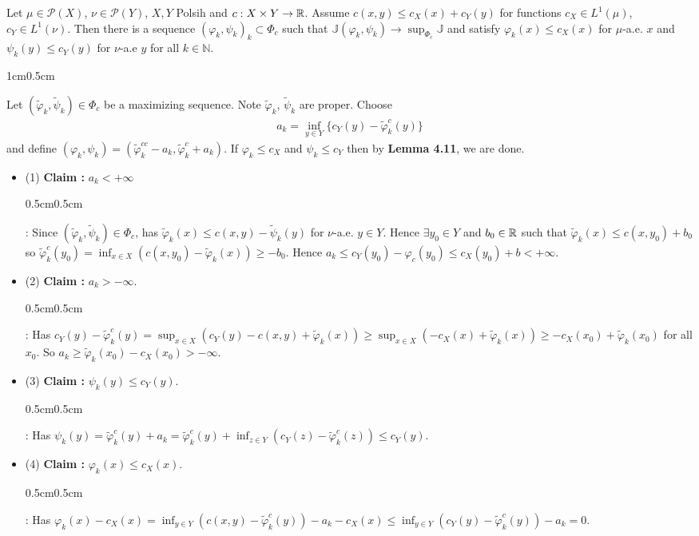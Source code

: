 \documentclass[12pt,a4paper]{article}
\newenvironment{proof}
{\begin{changemargin}{1cm}{0.5cm} 
	}%
	{\end{changemargin}
}
\newenvironment{subproof}
{\begin{changemargin}{0.5cm}{0.5cm} 
	}%
	{\end{changemargin}
}
\renewenvironment{i}
{\begin{itemize} 
	}%
	{\end{itemize}
}
\newenvironment{p}
{\begin{proof} 
	}%
	{\end{proof}
}
\begin{document}
 Let $\mu \in \mathscr{P}(X)$, $\nu\in \mathscr{P}(Y)$, $X,Y$ Polsih and $c: X\times Y \rightarrow \mathbb{R}$. Assume $c(x,y) \leq c_X(x) + c_Y(y)$ for functions $c_X\in L^1(\mu) $, $c_Y\in L^1(\nu)$. Then there is a sequence $(\varphi_k, \psi_k)_k \subset \Phi_c$ such that $\mathbb{J}(\varphi_k, \psi_k) \rightarrow \sup_{\Phi_c} \mathbb{J}$ and satisfy $\varphi_k(x) \leq c_X(x)$ for $\mu$-a.e. $x$ and $\psi_k(y) \leq c_Y(y)$ for $\nu$-a.e $y$ for all $k\in \mathbb{N}$.
\begin{p}
\pf Let $(\tilde{\varphi}_k, \tilde{\psi}_k) \in \Phi_c$ be a maximizing sequence. Note $\tilde{\varphi}_k$, $\tilde{\psi}_k$ are proper. Choose
\begin{align*}
a_k = \inf_{y\in Y} \{c_Y(y) - \tilde{\varphi}^c_k (y)\}
\end{align*}
and define $(\varphi_k, \psi_k) = (\tilde{\varphi}^{cc}_k -a_k , \tilde{\varphi}^c_k + a_k)$. If $\varphi_k \leq c_X$ and $\psi_k \leq c_Y$ then by \textbf{Lemma 4.11}, we are done.
\begin{i}
\item[(1)] \textbf{Claim :} $a_k <   + \infty$
\begin{subproof}
: Since $(\tilde{\varphi}_k, \tilde{\psi}_k) \in \Phi_c$, has $\tilde{\varphi}_k(x) \leq c(x,y) - \tilde{\psi}_k(y)$ for $\nu$-a.e. $y\in Y$. Hence $\exists y_0 \in Y$ and $b_0 \in \mathbb{R}$ such that $\tilde{\varphi}_k(x)\leq c(x, y_0) + b_0$ so $\tilde{\varphi}_k^c(y_0) = \inf_{x\in X} (c(x, y_0) - \tilde{\varphi}_k(x))\geq -b_0$. Hence $a_k \leq c_Y(y_0) - \varphi_c(y_0) \leq c_X(y_0)+b< +\infty$.
\end{subproof}
\item[(2)] \textbf{Claim :} $a_k > - \infty$.
\begin{subproof}
: Has $c_Y(y) - \tilde{\varphi}^c_k(y) = \sup_{x\in X}(c_Y(y) - c(x,y) + \tilde{\varphi}_k(x)) \geq \sup_{x\in X} (-c_X(x) + \tilde{\varphi}_k(x)) \geq -c_X(x_0) + \tilde{\varphi}_k(x_0)$ for all $x_0$. So $a_k \geq \tilde{\varphi}_k(x_0) - c_X(x_0) > -\infty$.
\end{subproof}
\item[(3)] \textbf{Claim :} $\psi_k(y) \leq c_Y(y)$.
\begin{subproof}
: Has $\psi_k(y) = \tilde{\varphi}_k^c (y)+ a_k = \tilde{\varphi}^c_k(y) + \inf_{z\in Y}(c_Y(z)- \tilde{\varphi}^c_k(z)) \leq c_Y(y)$.
\end{subproof}
\item[(4)] \textbf{Claim :} $\varphi_k(x) \leq c_X(x)$.
\begin{subproof}
: Has $\varphi_k(x) - c_X(x) = \inf_{y\in Y} (c(x,y) -\tilde{\varphi}^c_k(y)) - a_k - c_X(x) \leq \inf_{y\in Y}(c_Y(y) - \tilde{\varphi}_k^c(y)) - a_k =0$.
\end{subproof} 
\end{i}
\eop
\end{p}
\s
\end{document}
